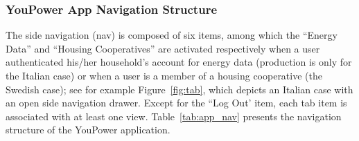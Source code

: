 %
%
%
%
%

\subsubsection{YouPower App Navigation Structure}

The side navigation (nav) is composed of six items, among which the ``Energy Data'' and ``Housing Cooperatives'' are activated respectively when a user authenticated his/her household's account for energy data (production is only for the Italian case) or when a user is a member of a housing cooperative (the Swedish case); see for example Figure~\ref{fig:tab}, which depicts an Italian case with an open side navigation drawer. Except for the ``Log Out' item, each tab item is associated with at least one view. Table~\ref{tab:app_nav} presents the navigation structure of the YouPower application. 

